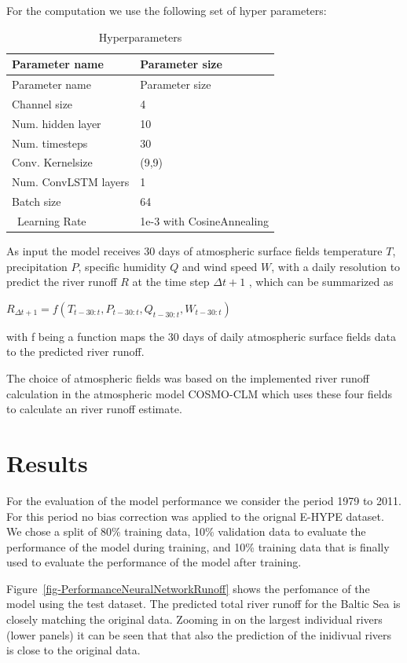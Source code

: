 \documentclass[
]{agujournal2019}
\begin{document}
For the computation we use the following set of hyper parameters:

\hypertarget{tbl-letters}{}
\begin{longtable}[]{@{}ll@{}}
\caption{\label{tbl-letters}Hyperparameters}\tabularnewline
\toprule()
Parameter name & Parameter size \\
\midrule()
\endfirsthead
\toprule()
Parameter name & Parameter size \\
\midrule()
\endhead
Channel size & 4 \\
Num. hidden layer & 10 \\
Num. timesteps & 30 \\
Conv. Kernelsize & (9,9) \\
Num. ConvLSTM layers & 1 \\
Batch size & 64 \\
~Learning Rate & 1e-3 with CosineAnnealing \\
\bottomrule()
\end{longtable}

As input the model receives 30 days of atmospheric surface fields
temperature \(T\), precipitation \(P\), specific humidity \(Q\) and wind
speed \(W\), with a daily resolution to predict the river runoff \(R\)
at the time step \(\Delta t+1\) , which can be summarized as

\(R_{\Delta t+1} = f\left(T_{t-30:t}, P_{t-30:t}, Q_{t-30:t}, W_{t-30:t}\right)\)

with f being a function maps the 30 days of daily atmospheric surface
fields data to the predicted river runoff.

The choice of atmospheric fields was based on the implemented river
runoff calculation in the atmospheric model COSMO-CLM which uses these
four fields to calculate an river runoff estimate.

\hypertarget{results}{%
\section{Results}\label{results}}

For the evaluation of the model performance we consider the period 1979
to 2011. For this period no bias correction was applied to the orignal
E-HYPE dataset. We chose a split of 80\% training data, 10\% validation
data to evaluate the performance of the model during training, and 10\%
training data that is finally used to evaluate the performance of the
model after training.

Figure~\ref{fig-PerformanceNeuralNetworkRunoff} shows the perfomance of
the model using the test dataset. The predicted total river runoff for
the Baltic Sea is closely matching the original data. Zooming in on the
largest individual rivers (lower panels) it can be seen that that also
the prediction of the inidivual rivers is close to the original data.
\end{document}
